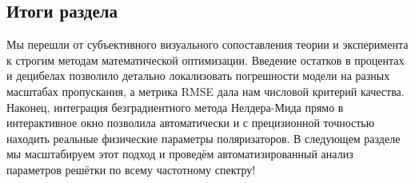 \subsection{Итоги раздела}
Мы перешли от субъективного визуального сопоставления теории и эксперимента к строгим методам математической оптимизации. Введение остатков в процентах и децибелах позволило детально локализовать погрешности модели на разных масштабах пропускания, а метрика RMSE дала нам числовой критерий качества. Наконец, интеграция безградиентного метода Нелдера-Мида прямо в интерактивное окно позволила автоматически и с прецизионной точностью находить реальные физические параметры поляризаторов. В следующем разделе мы масштабируем этот подход и проведём автоматизированный анализ параметров решётки по всему частотному спектру!

